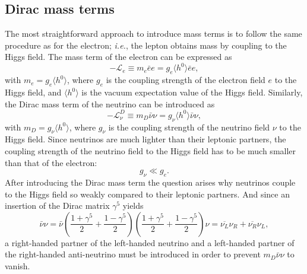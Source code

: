 \subsection{Dirac mass terms}
\label{sec:dirac}
The most straightforward approach to introduce mass terms is to follow
the same procedure as for the electron; \textit{i.e.}, the lepton
obtains mass by coupling to the Higgs field. The mass term of the
electron can be expressed as
\begin{equation}
  \label{eq:dme}
  -\mathcal{L}_{e} \equiv m_{e}\bar{e}e = g_{e}\langle      
  h^{0}\rangle \bar{e}e,
\end{equation}
with $m_{e} = g_{e} \langle h^{0}\rangle$, where $g_e$ is the coupling
strength of the electron field $e$ to the Higgs field, and $\langle
h^{0} \rangle$ is the vacuum expectation value of the Higgs
field. Similarly, the Dirac mass term of the neutrino can be
introduced as
\begin{equation}
\label{eq:dmnu}
-\mathcal{L}_{\nu}^{D} \equiv m_{D}\bar{\nu}\nu = 
g_{\nu} \langle h^{0} \rangle \bar{\nu}\nu,
\end{equation}
with $m_{D} = g_{\nu} \langle h^{0}\rangle$, where $g_\nu$ is the
coupling strength of the neutrino field $\nu$ to the Higgs
field. Since neutrinos are much lighter than their leptonic partners,
the coupling strength of the neutrino field to the Higgs field has to
be much smaller than that of the electron:
\begin{equation}
  \label{eq:gg}
  g_{\nu} \ll g_{e}.
\end{equation}
After introducing the Dirac mass term the question arises why
neutrinos couple to the Higgs field so weakly compared to their
leptonic partners. And since an insertion of the Dirac matrix
$\gamma^{5}$ yields
\begin{equation}
  \label{eq:2psi}
  \bar{\nu}\nu = \bar{\nu}    
  \left(\frac{1+\gamma^5}{2}+\frac{1-\gamma^5}{2}\right)
  \left(\frac{1+\gamma^5}{2}+\frac{1-\gamma^5}{2}\right) \nu =
  \overline{\nu_{L}}\nu_{R}+\overline{\nu_{R}}\nu_{L},
\end{equation}
a right-handed partner of the left-handed neutrino and a left-handed
partner of the right-handed anti-neutrino must be introduced in order
to prevent $m_{D}\bar{\nu}\nu$ to vanish.

